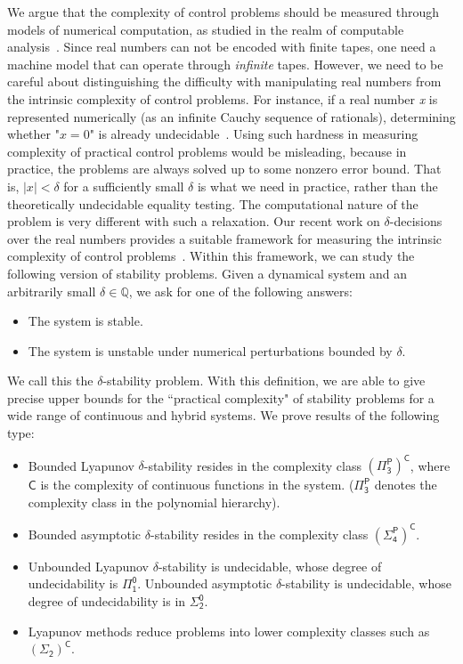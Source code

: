 \documentclass[10pt]{article}
\theoremstyle{plain}
\theoremstyle{definition}
\begin{document}
We argue that the complexity of control problems should be measured through models of numerical computation, as studied in the realm of computable analysis~\cite{CAbook,Kobook,16557}. Since real numbers can not be encoded with finite tapes, one need a machine model that can operate through {\em infinite} tapes. However, we need to be careful about distinguishing the difficulty with manipulating real numbers from the intrinsic complexity of control problems. For instance, if a real number {\em x} is represented numerically (as an infinite Cauchy sequence of rationals), determining whether "$x=0$" is already undecidable~\cite{CAbook}. Using such hardness in measuring complexity of practical control problems would be misleading, because in practice, the problems are always solved up to some nonzero error bound. That is, $|x|<\delta$ for a sufficiently small $\delta$ is what we need in practice, rather than the theoretically undecidable equality testing. The computational nature of the problem is very different with such a relaxation. Our recent work on $\delta$-decisions over the real numbers provides a suitable framework for measuring the intrinsic complexity of control problems~\cite{DBLP:conf/lics/GaoAC12,DBLP:conf/cade/GaoAC12}. Within this framework, we can study the following version of stability problems. Given a dynamical system and an arbitrarily small $\delta\in \mathbb{Q}$, we ask for one of the following answers:
\begin{itemize}
\item The system is stable. 
\item The system is unstable under numerical perturbations bounded by $\delta$. 
\end{itemize}
We call this the $\delta$-stability problem. With this definition, we are able to give precise upper bounds for the ``practical complexity" of stability problems for a wide range of continuous and hybrid systems. We prove results of the following type:
\begin{itemize}
\item Bounded Lyapunov $\delta$-stability resides in the complexity class $\mathsf{(\Pi^P_3)^C}$, where $\mathsf{C}$ is the complexity of continuous functions in the system. ($\mathsf{\Pi^P_3}$ denotes the complexity class in the polynomial hierarchy).
\item Bounded asymptotic $\delta$-stability resides in the complexity class $\mathsf{(\Sigma^P_4)^C}$. 
\item Unbounded Lyapunov $\delta$-stability is undecidable, whose degree of undecidability is $\mathsf{\Pi^0_1}$. Unbounded asymptotic $\delta$-stability is undecidable, whose degree of undecidability is in $\mathsf{\Sigma^0_2}$.
\item Lyapunov methods reduce problems into lower complexity classes such as $\mathsf{(\Sigma_2)^C}$.  
\end{itemize}
\end{document}
